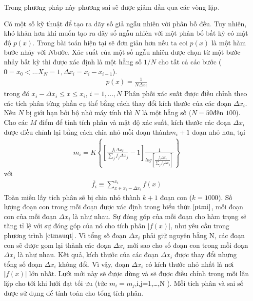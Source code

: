 Trong phương pháp này phương sai sẽ được giảm dần qua các vòng lặp.\par
Có một số kỹ thuật để tạo ra dãy số giả ngẫu nhiên với phân bố đều. 
Tuy nhiên, khó khăn hơn khi muốn tạo ra dãy số ngẫu nhiên với một phân bố bất kỳ có mật độ $p(x)$. 
Trong bài toán hiện tại sẽ đơn giản hơn nếu ta coi $p(x)$ là một hàm bước nhảy với $N$bước. 
Xác suất của một số ngẫu nhiên được chọn từ một bước nhảy bất kỳ thì được xác định là một hằng số $1/N$ cho tất cả các bước ($0=x_0 < … X_N =1, {\Delta}x_i = x_i-x_{i-1}$).
\begin{align}
      p(x)=\frac{1}{N{\Delta}x_i}
\end{align}
trong đó $x_i-{\Delta}x_i\leq x \leq x_i$, $i=1, ...,N $ 
Phân phối xác suất được điều chỉnh theo các tích phân từng phần cụ thể bằng cách thay đổi kích thước của các đoạn ${\Delta}x_i$. Nếu $N$ bị giới hạn bởi bộ nhớ máy tính  thì $N$ là một hằng số ($N = 50 $đến $100$).
Cho các $M$ điểm để tính tích phân và mật độ xác suất, kích thước các đoạn ${\Delta}x_i$ được điều chỉnh lại bằng cách chia nhỏ mỗi đoạn thành$ m_i + 1$ đoạn nhỏ hơn, tại
\begin{align}
      m_i=K\left\{ \left[ \frac{\overline{f_i}{\Delta}x_i}{\sum_j{f_j{\Delta}x_j}}-1\right]{\frac{1}{log\left[ {\frac{\overline{f_i}{\Delta}x_i}{\sum_j\overline{f_j}{\Delta}x_j}}\right]}}\right\}\label{ptmi}
\end{align}
với
\begin{align}
      \overline{f_i} \equiv {\sum_{x\in{x_i-\Delta}x_i}^{x_i}}{f(x)}\label{pt3.12}
\end{align}
Toàn miền lấy tích phân sẽ bị chia nhỏ thành $k+1$ đoạn con ($k=1000$). \label{giaithichmi}
Số lượng đoạn con trong mỗi đoạn được xác định trong biểu thức $ \ref{ptmi} $,
mỗi đoạn con của mỗi đoạn ${\Delta}x_i $ là như nhau. Sự đóng góp của mỗi đoạn cho hàm trọng sẽ tăng tỉ lệ với sự đóng góp của nó cho tích phân $|f(x)|$, 
như yêu cầu trong phương trình $ \ref{ctmauqt}$. Vì tổng số đoạn ${\Delta}x_i $ phải giữ nguyên bằng N, 
các đoạn con sẽ được gom lại thành các đoạn ${\Delta}x_i $ mới sao cho số đoạn con trong mỗi đoạn ${\Delta}x_i $ là như nhau. 
Kết quả, kích thước của các đoạn ${\Delta}x_i $ được thay đổi nhưng tổng số đoạn ${\Delta}x_i $ không đổi. Vì vậy, đoạn ${\Delta}x_i $ có kích thước nhỏ nhất là nơi $|f(x)|$ lớn nhất. 
Lưới mới này sẽ được dùng và sẽ được điều chỉnh trong mỗi lần lặp cho tới khi lưới đạt tối ưu (tức $m_i=m_j$,i,j=1,…,N ). 
Mỗi tích phân và sai số được sử dụng để tính toán cho tổng tích phân.\par
